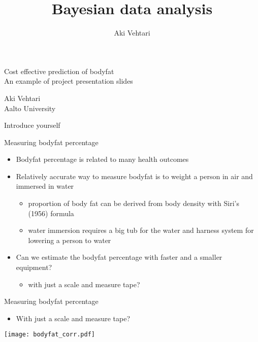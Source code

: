 \documentclass[english,t]{beamer}
\title[]{Bayesian data analysis}
\subtitle{}
\author[Aki.Vehtari@aalto.fi -- @avehtari]{Aki Vehtari}
\institute[Aalto]{}
\date[]{}
\begin{document}
\begin{frame}

  \centering

  \baselineskip

  \LARGE{\color{navyblue} Cost effective prediction of bodyfat}\\
      \large{\color{gray} An example of project presentation slides}


    \baselineskip

    \Large{Aki Vehtari}\\
    \large{Aalto University}

    \baselineskip

    \pause
    Introduce yourself

  
\end{frame}

\begin{frame}
  
  {\Large\color{navyblue} Measuring bodyfat percentage}


  \begin{itemize}
  \item Bodyfat percentage is related to many health outcomes
  \item<2-> Relatively accurate way to measure bodyfat is to weight a
    person in air and immersed in water
    \begin{itemize}
    \item proportion of body fat can be derived from body density with
      Siri's (1956) formula
    \item water immersion requires a big tub for the water and harness
      system for lowering a person to water
    \end{itemize}
  \item<3-> Can we estimate the bodyfat percentage with faster and a
    smaller equipment?
    \begin{itemize}
    \item with just a scale and measure tape?
    \end{itemize}
  \end{itemize}
  \vspace{2\baselineskip}
  
\end{frame}

\begin{frame}
  
  {\Large\color{navyblue} Measuring bodyfat percentage}


  \begin{itemize}
  \item With just a scale and measure tape?
  \end{itemize}
  
  \vspace{-1\baselineskip}
  \texttt{[image: bodyfat\_corr.pdf]}

\end{frame}
\end{document}
